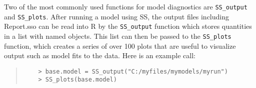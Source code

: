 Two of the most commonly used functions for model diagnostics are \texttt{SS\_output} and \texttt{SS\_plots}. After running a model using SS, the output files including Report.sso can be read into R by the \texttt{SS\_output} function which stores quantities in a list with named objects.  This list can then be passed to the \texttt{SS\_plots} function, which creates a series of over 100 plots that are useful to visualize output such as model fits to the data. Here is an example call:

\begin{quote}
	\begin{verbatim}
	> base.model = SS_output("C:/myfiles/mymodels/myrun")
	> SS_plots(base.model)
	\end{verbatim}
\end{quote}
  
